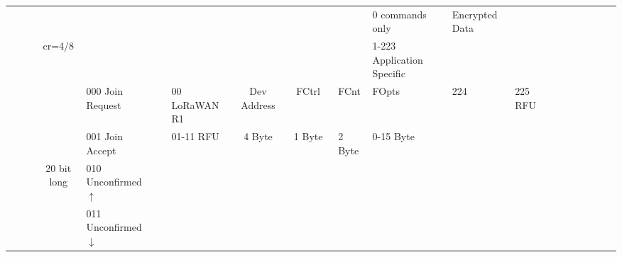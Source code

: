 \begin{table}[h!]
\begin{tabular}{llllllllllllllllllllllllll}
				&														&								&																		&																						&															&															&															&																											&														&																							&																		&																			&																																	&																																		&																	&	0	commands only	&	Encrypted  Data					&																&							&																\\
				&														&								&	\multicolumn{2}{c}{cr=4/8}															&															&															&															&																											&														&																							&																		&																			&																																	&																																		&																	&	1-223	Application Specific							&																								&																&							&																\\
				&														&								&															 			&																						&	000	Join Request						&															&	00			LoRaWAN R1					&	\multicolumn{2}{c}{Dev Address}											&	\multicolumn{5}{c}{FCtrl }																																																																																						&	FCnt 																							&	FOpts 						&	224 & 225	RFU																&																								&																&							&																\\
				&														&								&															 			&																						&	001	Join Accept							&															&	01-11		RFU									&	\multicolumn{2}{c}{4 Byte}													&	\multicolumn{5}{c}{1 Byte}																																																																																													&	2 Byte																														&	0-15 Byte												&																							&																								&																&							&																\\
				&														&								&	\multicolumn{2}{c}{20 bit long}																								&	010	Unconfirmed $\uparrow$		&															&															& 											&															&														&																							&																		&																			&																																	&																																		&																	&																							&																								&																&							&																\\
				&														&								&																		&																						&	011	Unconfirmed $\downarrow$		&															&															&												&															&														&																							&																		&																			&																																	&																																		&																	&																							&																								&																&							&																\\

\end{tabular}
\end{table}
